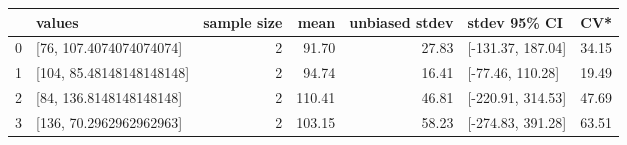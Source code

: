 \begin{tabular}{llrrrlr}
\toprule
 & values & sample size & mean & unbiased stdev & stdev 95\% CI & CV* \\
\midrule
0 & [76, 107.4074074074074] & 2 & 91.70 & 27.83 & [-131.37, 187.04] & 34.15 \\
1 & [104, 85.48148148148148] & 2 & 94.74 & 16.41 & [-77.46, 110.28] & 19.49 \\
2 & [84, 136.8148148148148] & 2 & 110.41 & 46.81 & [-220.91, 314.53] & 47.69 \\
3 & [136, 70.2962962962963] & 2 & 103.15 & 58.23 & [-274.83, 391.28] & 63.51 \\
\bottomrule
\end{tabular}
